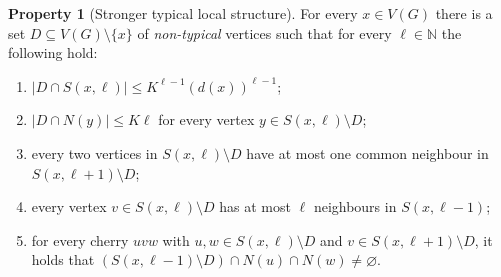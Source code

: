 \documentclass[reqno,a4paper,11pt]{amsart}
\newcounter{prop}
\theoremstyle{definition}
\newtheorem{property}{Property}
\renewcommand{\theproperty}{P\arabic{property}}
\renewcommand{\leq}{\leqslant}
\begin{document}
\let\oldproperty\theproperty\renewcommand{\theproperty}{P3$'$}
\begin{property}[Stronger typical local structure]\makeatletter\edef\@currentlabel{(\theproperty)}\makeatother\label{c:localconnectionstrong}
  For every $x\in V(G)$ there is a set $D \subseteq V(G) \setminus \{x\}$ of \emph{non-typical} vertices such that for every $\ell \in \mathbb{N}$ the following hold:
  \begin{enumerate}[$(i)$]
  \item\label{i:smallnew} $|D\cap S(x,\ell)| \leq  K^{\ell-1} (d(x))^{\ell-1}$;
  \item\label{i:sparsenew} $|D\cap N(y)| \leq K\ell$ for every vertex $y \in S(x, \ell) \setminus D$;
  \item\label{i:cherrynew} every two vertices in $S(x, \ell) \setminus D$ have at most one common neighbour in $S(x, \ell+1) \setminus D$;
  \item\label{i:backwardstrong} every vertex $v \in S(x, \ell) \setminus D$ has at most $\ell$ neighbours in $S(x, \ell-1)$;
  \item\label{i:cherries} for every cherry $uvw$ with $u, w \in S(x, \ell) \setminus D$ and $v \in S(x, \ell+1) \setminus D$, it holds that $(S(x, \ell-1) \setminus D) \cap N(u) \cap N(w) \neq \varnothing$.
  \end{enumerate}
\end{property}
\let\theproperty\oldproperty\addtocounter{property}{-1}
\end{document}
